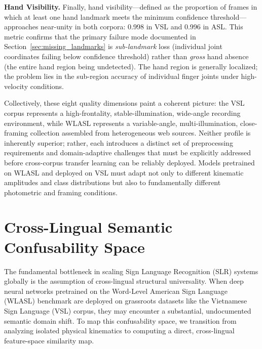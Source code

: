 \documentclass{ieeeaccess}
\begin{document}
\textbf{Hand Visibility.} Finally, hand visibility—defined as the proportion of frames in which at least one hand landmark meets the minimum confidence threshold—approaches near-unity in both corpora: 0.998 in VSL and 0.996 in ASL. This metric confirms that the primary failure mode documented in Section~\ref{sec:missing_landmarks} is \textit{sub-landmark} loss (individual joint coordinates failing below confidence threshold) rather than \textit{gross} hand absence (the entire hand region being undetected). The hand region is generally localized; the problem lies in the sub-region accuracy of individual finger joints under high-velocity conditions.

Collectively, these eight quality dimensions paint a coherent picture: the VSL corpus represents a high-frontality, stable-illumination, wide-angle recording environment, while WLASL represents a variable-angle, multi-illumination, close-framing collection assembled from heterogeneous web sources. Neither profile is inherently superior; rather, each introduces a distinct set of preprocessing requirements and domain-adaptive challenges that must be explicitly addressed before cross-corpus transfer learning can be reliably deployed. Models pretrained on WLASL and deployed on VSL must adapt not only to different kinematic amplitudes and class distributions but also to fundamentally different photometric and framing conditions.

\section{Cross-Lingual Semantic Confusability Space} \label{sec:similarity}

The fundamental bottleneck in scaling Sign Language Recognition (SLR) systems globally is the assumption of cross-lingual structural universality. When deep neural networks pretrained on the Word-Level American Sign Language (WLASL) benchmark are deployed on grassroots datasets like the Vietnamese Sign Language (VSL) corpus, they may encounter a substantial, undocumented semantic domain shift. To map this confusability space, we transition from analyzing isolated physical kinematics to computing a direct, cross-lingual feature-space similarity map.

\end{document}
